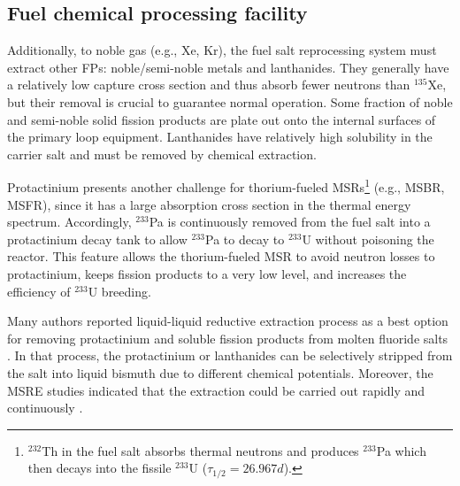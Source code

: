 \subsection{Fuel chemical processing facility} \label{sec:chemical_processing}
Additionally, to noble gas (e.g., Xe, Kr), the fuel salt reprocessing system  
must extract other \glspl{FP}: noble/semi-noble metals and lanthanides. They  
generally have a relatively low capture cross section and thus absorb fewer 
neutrons than $^{135}$Xe, but their removal is crucial to guarantee normal  
operation. Some fraction of noble and semi-noble solid fission products are 
plate out onto the internal surfaces of the primary loop equipment. 
Lanthanides have relatively high solubility in the carrier salt and must be 
removed by chemical extraction. 

Protactinium presents another challenge for thorium-fueled 
\glspl{MSR}\footnote{$^{232}$Th in the fuel salt absorbs thermal neutrons 
and produces $^{233}$Pa which then decays into the fissile $^{233}$U 
($\tau_{1/2}=26.967d$).} (e.g., \gls{MSBR}, \gls{MSFR}), since it has a large 
absorption cross section in  the thermal energy spectrum. Accordingly, 
$^{233}$Pa is continuously removed from the fuel salt into a protactinium
decay tank to allow $^{233}$Pa to decay to $^{233}$U without poisoning the 
reactor. This feature allows the thorium-fueled \gls{MSR} to avoid neutron 
losses to protactinium, keeps fission products to a very low level, and 
increases the efficiency of $^{233}$U breeding. 

Many authors reported liquid-liquid reductive extraction process as a best 
option for removing protactinium and soluble fission products from 
molten fluoride salts \cite{briggs_molten-salt_1969, delpech_molten_2010, 
doligez_coupled_2014}. In that process, the protactinium or lanthanides can be 
selectively stripped from the salt into liquid bismuth due to different 
chemical potentials. Moreover, the \gls{MSRE} studies indicated that the 
extraction could be carried out rapidly and continuously  
\cite{whatley_engineering_1970}.

